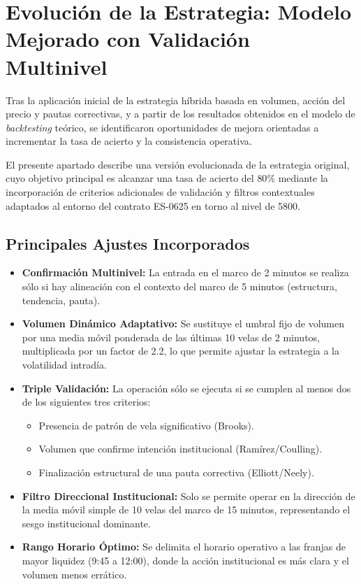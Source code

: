 \section{Evoluci\'on de la Estrategia: Modelo Mejorado con Validaci\'on Multinivel}

Tras la aplicaci\'on inicial de la estrategia h\'ibrida basada en volumen, acci\'on del precio y pautas correctivas, y a partir de los resultados obtenidos en el modelo de \textit{backtesting} te\'orico, se identificaron oportunidades de mejora orientadas a incrementar la tasa de acierto y la consistencia operativa.

El presente apartado describe una versi\'on evolucionada de la estrategia original, cuyo objetivo principal es alcanzar una tasa de acierto del $80\%$ mediante la incorporaci\'on de criterios adicionales de validaci\'on y filtros contextuales adaptados al entorno del contrato ES-0625 en torno al nivel de 5800.

\subsection{Principales Ajustes Incorporados}

\begin{itemize}
    \item \textbf{Confirmaci\'on Multinivel:} La entrada en el marco de 2 minutos se realiza s\'olo si hay alineaci\'on con el contexto del marco de 5 minutos (estructura, tendencia, pauta).
    
    \item \textbf{Volumen Din\'amico Adaptativo:} Se sustituye el umbral fijo de volumen por una media m\'ovil ponderada de las \'{u}ltimas 10 velas de 2 minutos, multiplicada por un factor de 2.2, lo que permite ajustar la estrategia a la volatilidad intrad\'ia.

    \item \textbf{Triple Validaci\'on:} La operaci\'on s\'olo se ejecuta si se cumplen al menos dos de los siguientes tres criterios:
    \begin{itemize}
        \item Presencia de patr\'on de vela significativo (Brooks).
        \item Volumen que confirme intenci\'on institucional (Ram\'irez/Coulling).
        \item Finalizaci\'on estructural de una pauta correctiva (Elliott/Neely).
    \end{itemize}

    \item \textbf{Filtro Direccional Institucional:} Solo se permite operar en la direcci\'on de la media m\'ovil simple de 10 velas del marco de 15 minutos, representando el sesgo institucional dominante.

    \item \textbf{Rango Horario Óptimo:} Se delimita el horario operativo a las franjas de mayor liquidez (9:45 a 12:00), donde la acci\'on institucional es m\'as clara y el volumen menos err\'atico.
\end{itemize}

